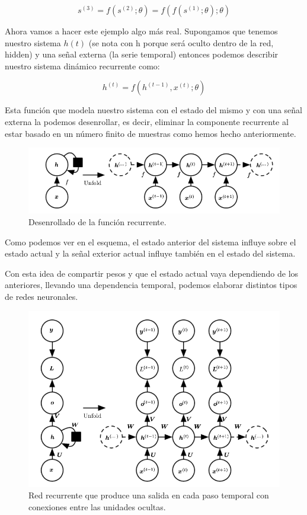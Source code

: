 $$s^{(3)} = f(s^{(2)};\theta) = f(f(s^{(1)};\theta);\theta)$$

Ahora vamos a hacer este ejemplo algo más real. Supongamos que tenemos nuestro sistema $h(t)$ (se nota con h porque será oculto dentro de la red, hidden) y una señal externa (la serie temporal) entonces podemos describir nuestro sistema dinámico recurrente como:

$$h^{(t)} = f(h^{(t-1)},x^{(t)};\theta)$$

Esta función que modela nuestro sistema con el estado del mismo y con una señal externa la podemos desenrollar, es decir, eliminar la componente recurrente al estar basado en un número finito de muestras como hemos hecho anteriormente.

\begin{figure}[H]
	\centering
	\includegraphics[scale=0.5]{imagenes/desenrollado.png}
	\caption{Desenrollado de la función recurrente.}
	\label{img:desenrollado-recurrente}
\end{figure}

Como podemos ver en el esquema, el estado anterior del sistema influye sobre el estado actual y la señal exterior actual influye también en el estado del sistema.

Con esta idea de compartir pesos y que el estado actual vaya dependiendo de los anteriores, llevando una dependencia temporal, podemos elaborar distintos tipos de redes neuronales.

\begin{figure}[H]
	\centering
	\includegraphics[scale=0.5]{imagenes/rnn1.png}
	\caption{Red recurrente que produce una salida en cada paso temporal con conexiones entre las unidades ocultas.}
	\label{img:red-recurrente1}
\end{figure}

